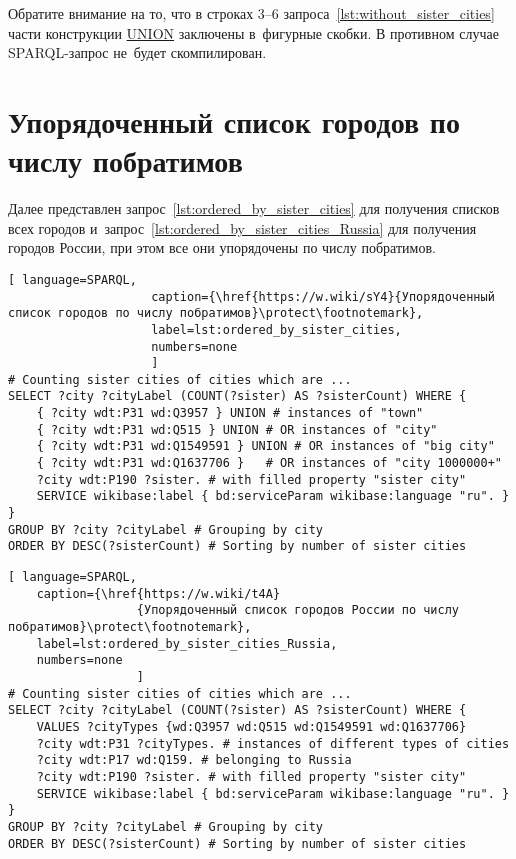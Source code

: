 Обратите внимание на то, что в строках 3--6 запроса~\ref{lst:without_sister_cities} 
части конструкции \href{https://en.wikibooks.org/wiki/SPARQL/UNION}{UNION} заключены в~фигурные скобки. 
В противном случае SPARQL-запрос не~будет скомпилирован.



\newpage
\section{Упорядоченный список городов по числу побратимов}

Далее представлен запрос~\ref{lst:ordered_by_sister_cities} 
для получения списков всех городов 
и~запрос~\ref{lst:ordered_by_sister_cities_Russia} для получения городов России, 
при этом все они упорядочены по числу побратимов.

\begin{lstlisting}[ language=SPARQL, 
                    caption={\href{https://w.wiki/sY4}{Упорядоченный список городов по числу побратимов}\protect\footnotemark},
                    label=lst:ordered_by_sister_cities,
                    numbers=none
                    ]
# Counting sister cities of cities which are ...
SELECT ?city ?cityLabel (COUNT(?sister) AS ?sisterCount) WHERE {           
	{ ?city wdt:P31 wd:Q3957 } UNION # instances of "town"
	{ ?city wdt:P31 wd:Q515 } UNION # OR instances of "city"
	{ ?city wdt:P31 wd:Q1549591 } UNION # OR instances of "big city"
	{ ?city wdt:P31 wd:Q1637706 }	# OR instances of "city 1000000+"
	?city wdt:P190 ?sister. # with filled property "sister city"
	SERVICE wikibase:label { bd:serviceParam wikibase:language "ru". }
}
GROUP BY ?city ?cityLabel # Grouping by city                                   
ORDER BY DESC(?sisterCount) # Sorting by number of sister cities
\end{lstlisting}

\begin{lstlisting}[ language=SPARQL, 
    caption={\href{https://w.wiki/t4A}
                  {Упорядоченный список городов России по числу побратимов}\protect\footnotemark},
    label=lst:ordered_by_sister_cities_Russia,
    numbers=none
                  ]
# Counting sister cities of cities which are ...
SELECT ?city ?cityLabel (COUNT(?sister) AS ?sisterCount) WHERE {           
	VALUES ?cityTypes {wd:Q3957 wd:Q515 wd:Q1549591 wd:Q1637706}
	?city wdt:P31 ?cityTypes. # instances of different types of cities
	?city wdt:P17 wd:Q159. # belonging to Russia
	?city wdt:P190 ?sister. # with filled property "sister city"
	SERVICE wikibase:label { bd:serviceParam wikibase:language "ru". }
}
GROUP BY ?city ?cityLabel # Grouping by city
ORDER BY DESC(?sisterCount) # Sorting by number of sister cities
\end{lstlisting}

